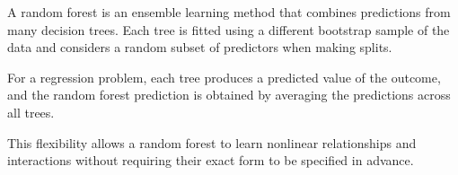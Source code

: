 \documentclass[
  letterpaper,
  DIV=11,
  numbers=noendperiod]{scrreprt}
\newenvironment{Shaded}{\begin{snugshade}}{\end{snugshade}}
\newcommand{\AttributeTok}[1]{\textcolor[rgb]{0.40,0.45,0.13}{#1}}
\newcommand{\DecValTok}[1]{\textcolor[rgb]{0.68,0.00,0.00}{#1}}
\newcommand{\FunctionTok}[1]{\textcolor[rgb]{0.28,0.35,0.67}{#1}}
\newcommand{\NormalTok}[1]{\textcolor[rgb]{0.00,0.23,0.31}{#1}}
\newcommand{\OtherTok}[1]{\textcolor[rgb]{0.00,0.23,0.31}{#1}}
\newcommand{\SpecialCharTok}[1]{\textcolor[rgb]{0.37,0.37,0.37}{#1}}
\newcommand{\StringTok}[1]{\textcolor[rgb]{0.13,0.47,0.30}{#1}}
\begin{document}
A random forest is an ensemble learning method that combines predictions
from many decision trees. Each tree is fitted using a different
bootstrap sample of the data and considers a random subset of predictors
when making splits.

For a regression problem, each tree produces a predicted value of the
outcome, and the random forest prediction is obtained by averaging the
predictions across all trees.

This flexibility allows a random forest to learn nonlinear relationships
and interactions without requiring their exact form to be specified in
advance.

\begin{Shaded}
\end{Shaded}
\end{document}
